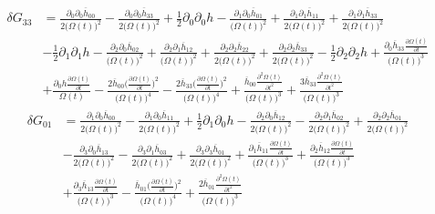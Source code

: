 \documentclass[10pt,letterpaper]{article}
\begin{document}
\begin{align}
	\delta G_{33} &= \frac{\partial_{0}\partial_{0}\overline{h}_{00}}{2 \bigl(\Omega(t)\bigr)^2} -  \frac{\partial_{0}\partial_{0}\overline{h}_{33}}{2 \bigl(\Omega(t)\bigr)^2} + \tfrac{1}{2} \partial_{0}\partial_{0}h -  \frac{\partial_{1}\partial_{0}\overline{h}_{01}}{\bigl(\Omega(t)\bigr)^2} + \frac{\partial_{1}\partial_{1}\overline{h}_{11}}{2 \bigl(\Omega(t)\bigr)^2} + \frac{\partial_{1}\partial_{1}\overline{h}_{33}}{2 \bigl(\Omega(t)\bigr)^2}\\
& -  \tfrac{1}{2} \partial_{1}\partial_{1}h -  \frac{\partial_{2}\partial_{0}\overline{h}_{02}}{\bigl(\Omega(t)\bigr)^2} + \frac{\partial_{2}\partial_{1}\overline{h}_{12}}{\bigl(\Omega(t)\bigr)^2} + \frac{\partial_{2}\partial_{2}\overline{h}_{22}}{2 \bigl(\Omega(t)\bigr)^2} + \frac{\partial_{2}\partial_{2}\overline{h}_{33}}{2 \bigl(\Omega(t)\bigr)^2} -  \tfrac{1}{2} \partial_{2}\partial_{2}h + \frac{\partial_{0}\overline{h}_{33} \frac{\partial \Omega(t)}{\partial t}}{\bigl(\Omega(t)\bigr)^3} \\
&+ \frac{\partial_{0}h \frac{\partial \Omega(t)}{\partial t}}{\Omega(t)} -  \frac{2 \overline{h}_{00} \bigl(\frac{\partial \Omega(t)}{\partial t}\bigr)^2}{\bigl(\Omega(t)\bigr)^4} -  \frac{2 \overline{h}_{33} \bigl(\frac{\partial \Omega(t)}{\partial t}\bigr)^2}{\bigl(\Omega(t)\bigr)^4} + \frac{\overline{h}_{00} \frac{\partial^{2}\Omega(t)}{\partial t^{2}}}{\bigl(\Omega(t)\bigr)^3} + \frac{3 \overline{h}_{33} \frac{\partial^{2}\Omega(t)}{\partial t^{2}}}{\bigl(\Omega(t)\bigr)^3}
\end{align}
\begin{align}
	\delta G_{01} &=\frac{\partial_{1}\partial_{0}\overline{h}_{00}}{2 \bigl(\Omega(t)\bigr)^2} -  \frac{\partial_{1}\partial_{0}\overline{h}_{11}}{2 \bigl(\Omega(t)\bigr)^2} + \tfrac{1}{2} \partial_{1}\partial_{0}h -  \frac{\partial_{2}\partial_{0}\overline{h}_{12}}{2 \bigl(\Omega(t)\bigr)^2} -  \frac{\partial_{2}\partial_{1}\overline{h}_{02}}{2 \bigl(\Omega(t)\bigr)^2} + \frac{\partial_{2}\partial_{2}\overline{h}_{01}}{2 \bigl(\Omega(t)\bigr)^2}\\
& -  \frac{\partial_{3}\partial_{0}\overline{h}_{13}}{2 \bigl(\Omega(t)\bigr)^2} -  \frac{\partial_{3}\partial_{1}\overline{h}_{03}}{2 \bigl(\Omega(t)\bigr)^2} + \frac{\partial_{3}\partial_{3}\overline{h}_{01}}{2 \bigl(\Omega(t)\bigr)^2} + \frac{\partial_{1}\overline{h}_{11} \frac{\partial \Omega(t)}{\partial t}}{\bigl(\Omega(t)\bigr)^3} + \frac{\partial_{2}\overline{h}_{12} \frac{\partial \Omega(t)}{\partial t}}{\bigl(\Omega(t)\bigr)^3}\\
& + \frac{\partial_{3}\overline{h}_{13} \frac{\partial \Omega(t)}{\partial t}}{\bigl(\Omega(t)\bigr)^3} -  \frac{\overline{h}_{01} \bigl(\frac{\partial \Omega(t)}{\partial t}\bigr)^2}{\bigl(\Omega(t)\bigr)^4} + \frac{2 \overline{h}_{01} \frac{\partial^{2}\Omega(t)}{\partial t^{2}}}{\bigl(\Omega(t)\bigr)^3}
\end{align}
\end{document}
